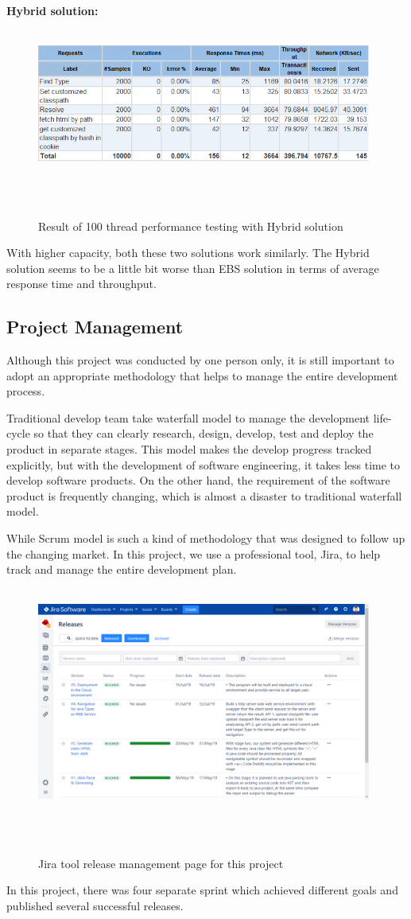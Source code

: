 \documentclass[runningheads]{llncs}
\begin{document}
\textbf{Hybrid solution:}
\begin{figure}[H]
    \centering
    \includegraphics[width=11cm]{pic/jmeter-100-hybrid.png}
    \caption{Result of 100 thread performance testing with Hybrid solution}
    \label{Result of 100 thread performance testing with Hybrid solution}
\end{figure}

With higher capacity, both these two solutions work similarly. The Hybrid solution seems to be a little bit worse than EBS solution in terms of average response time and throughput.

\subsection{Project Management}
Although this project was conducted by one person only, it is still important to adopt an appropriate methodology that helps to manage the entire development process.

Traditional develop team take waterfall\cite{Waterfall_model} model to manage the development life-cycle so that they can clearly research, design, develop, test and deploy the product in separate stages. This model makes the develop progress tracked explicitly, but with the development of software engineering, it takes less time to develop software products. On the other hand, the requirement of the software product is frequently changing, which is almost a disaster to traditional waterfall model.

While Scrum\cite{Scrum} model is such a kind of methodology that was designed to follow up the changing market. In this project, we use a professional tool, Jira\cite{jira}, to help track and manage the entire development plan.

\begin{figure}[H]
    \centering
    \includegraphics[width=11cm]{pic/jira.png}
    \caption{Jira tool release management page for this project}
    \label{Jira tool release management page for this project}
\end{figure}
In this project, there was four separate sprint which achieved different goals and published several successful releases. 
\end{document}
